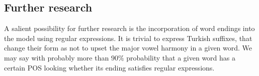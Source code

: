 \documentclass{article}
\begin{document}
\subsection{Further research}

A salient possibility for further research is the incorporation of word endings
into the model using regular expressions. It is trivial to express Turkish
suffixes, that change their form as not to upset the major vowel harmony in a
given word. We may say with probably more than $90\%$ probability that a given
word has a certain POS looking whether its ending satisfies regular expressions.



\end{document}

